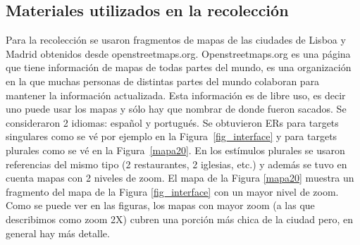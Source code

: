 \subsection{Materiales utilizados en la recolecci\'on}
\label{corpus-materiales}

Para la recolecci\'on se usaron fragmentos de mapas de las ciudades de Lisboa y Madrid obtenidos desde openstreetmaps.org. Openstreetmaps.org es una p\'agina que tiene informaci\'on de mapas de todas partes del mundo, es una organizaci\'on en la que muchas personas de distintas partes del mundo colaboran para mantener la informaci\'on actualizada. Esta informaci\'on es de libre uso, es decir uno puede usar los mapas y s\'olo hay que nombrar de donde fueron sacados.
Se consideraron 2 idiomas: espa\~nol y portugu\'es. Se obtuvieron ERs para targets singulares como se v\'e por ejemplo en la Figura~\ref{fig_interface} y para targets plurales como se v\'e en la Figura~\ref{mapa20}. En los est\'imulos plurales se usaron referencias del mismo tipo (2 restaurantes, 2 iglesias, etc.) y adem\'as se tuvo en cuenta mapas con 2 niveles de zoom. El mapa de la Figura \ref{mapa20} muestra un fragmento del mapa de la Figura \ref{fig_interface} con un mayor nivel de zoom. Como se puede ver en las figuras, los mapas con mayor zoom (a las que describimos como zoom 2X) cubren una porci\'on m\'as chica de la ciudad pero, en general hay m\'as detalle.




